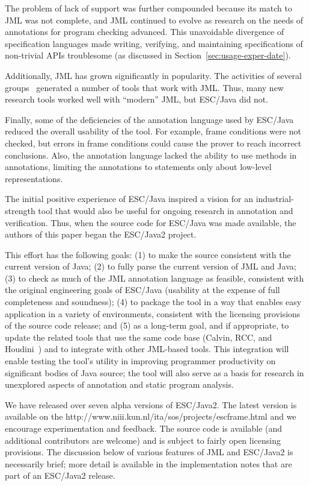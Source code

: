 \documentclass{llncs}
\begin{document}
The problem of lack of support was further compounded because its
match to JML was not complete, and JML continued to evolve as research
on the needs of annotations for program checking advanced.  This
unavoidable divergence of specification languages made writing,
verifying, and maintaining specifications of non-trivial APIs
troublesome (as discussed in Section~\ref{sec:usage-exper-date}).

Additionally, JML has grown significantly in popularity.  The
activities of several
groups~\cite{jmlpapers,Burdy-etal03,Leavens-etal00,NimmerErnst01,Bogor03}
generated a number of tools that work with JML.  Thus, many new
research tools worked well with ``modern'' JML, but ESC/Java did not.

Finally, some of the deficiencies of the annotation language used by
ESC/Java reduced the overall usability of the tool.  For example,
frame conditions were not checked, but errors in frame conditions
could cause the prover to reach incorrect conclusions.  Also, the
annotation language lacked the ability to use methods in annotations,
limiting the annotations to statements only about low-level
representations.

The initial positive experience of ESC/Java inspired a vision for an
industrial-strength tool that would also be useful for ongoing
research in annotation and verification.  Thus, when the source code
for ESC/Java was made available, the authors of this paper began the
ESC/Java2 project.

This effort has the following goals:
(1) to make the source consistent with the current version of Java;
(2) to fully parse the current version of JML and Java;
(3) to check as much of the JML annotation language as feasible,
consistent with the original engineering goals of ESC/Java
(usability at the expense of full completeness and soundness);
(4) to package the tool in a way that enables easy application in a
variety of environments, consistent with the licensing provisions of
the source code release; and
(5) as a long-term goal, and if appropriate, to update the related
tools that use the same code base (Calvin, RCC, and
Houdini~\cite{flanagan01houdini}) and to integrate with other
JML-based tools.  This integration will enable testing the tool's
utility in improving programmer productivity on significant bodies of
Java source; the tool will also serve as a basis for research in
unexplored aspects of annotation and static program analysis.
  
We have released over seven alpha versions of ESC/Java2.  The latest
version is available on the 
{http://www.niii.kun.nl/ita/sos/projects/escframe.html} and we
encourage experimentation and feedback.  The source code is available
(and additional contributors are welcome) and is subject to fairly
open licensing provisions.  The discussion below of various features
of JML and ESC/Java2 is necessarily brief; more detail is available in
the implementation notes that are part of an ESC/Java2 release.
\end{document}
